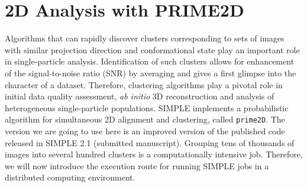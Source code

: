 \documentclass[a4paper,11pt]{article}
\newcommand{\prgname}[1]{\textcolor{NavyBlue}{\texttt{#1}}}
\begin{document}
\section{2D Analysis with PRIME2D}
Algorithms that can rapidly discover clusters corresponding to sets of images with similar projection direction and conformational state play an important role in single-particle analysis. Identification of such clusters allows for enhancement of the signal-to-noise ratio (SNR) by averaging and gives a first glimpse into the character of a dataset. Therefore, clustering algorithms play a pivotal role in initial data quality assessment, \textit{ab initio} 3D reconstruction and analysis of heterogeneous single-particle populations. SIMPLE implements a probabilistic algorithm for simultaneous 2D alignment and clustering, called \prgname{prime2D}. The version we are going to use here is an improved version of the published code released in SIMPLE 2.1 (submitted manuscript). Grouping tens of thousands of images into several hundred clusters is a computationally intensive job. Therefore, we will now introduce the execution route for running SIMPLE jobs in a distributed computing environment.
\end{document}
